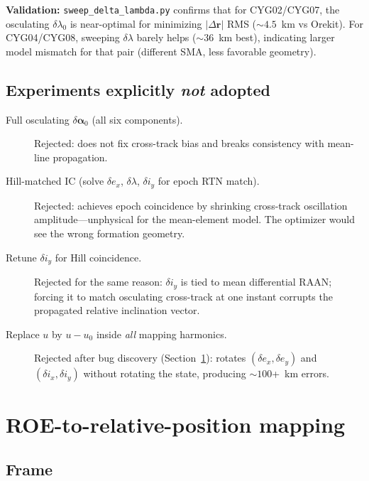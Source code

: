 \documentclass[11pt]{article}
\begin{document}
\textbf{Validation:} \texttt{sweep\_delta\_lambda.py} confirms that for CYG02/CYG07, the osculating $\delta\lambda_0$ is near-optimal for minimizing $|\Delta\mathbf{r}|$ RMS ($\sim 4.5$~km vs Orekit). For CYG04/CYG08, sweeping $\delta\lambda$ barely helps ($\sim 36$~km best), indicating larger model mismatch for that pair (different SMA, less favorable geometry).

\subsection{Experiments explicitly \emph{not} adopted}

\begin{description}
    \item[Full osculating $\delta\bm{\alpha}_0$ (all six components).]
    Rejected: does not fix cross-track bias and breaks consistency with mean-line propagation.

    \item[Hill-matched IC (solve $\delta e_x$, $\delta\lambda$, $\delta i_y$ for epoch RTN match).]
    Rejected: achieves epoch coincidence by shrinking cross-track oscillation amplitude---unphysical for the mean-element model. The optimizer would see the wrong formation geometry.

    \item[Retune $\delta i_y$ for Hill coincidence.]
    Rejected for the same reason: $\delta i_y$ is tied to mean differential RAAN; forcing it to match osculating cross-track at one instant corrupts the propagated relative inclination vector.

    \item[Replace $u$ by $u-u_0$ inside \emph{all} mapping harmonics.]
    Rejected after bug discovery (Section~\ref{sec:mapping}): rotates $(\delta e_x,\delta e_y)$ and $(\delta i_x,\delta i_y)$ without rotating the state, producing $\sim 100$+~km errors.
\end{description}

\section{ROE-to-relative-position mapping}
\label{sec:mapping}

\subsection{Frame}
\end{document}
